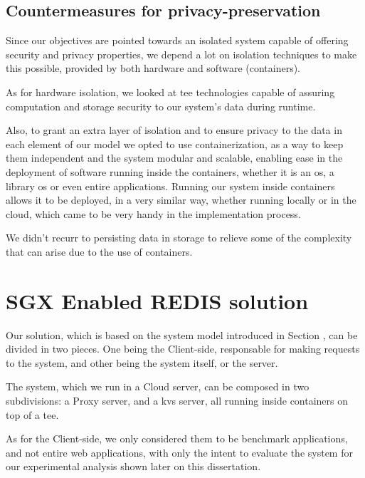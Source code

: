 \subsection{Countermeasures for privacy-preservation}

Since our objectives are pointed towards an isolated system capable of offering security
and privacy properties, we depend a lot on isolation techniques to make this possible,
provided by both hardware and software (containers).

As for hardware isolation, we looked at \gls{tee} technologies capable of assuring computation and storage security to our system's data during runtime.

Also, to grant an extra layer of isolation and to ensure privacy to the data in each element of our model we opted to use containerization, as a way to keep them independent and the system modular and scalable, enabling ease in the deployment of software running inside the containers, whether it is an \gls{os}, a library
\gls{os} or even entire applications. Running our system inside containers allows it to be deployed, in a very similar way, whether running locally or in the cloud, which came to be very handy in the implementation process. 

We didn't recurr to persisting data in storage to relieve some of the complexity that can arise due to the use of containers.





\section{SGX Enabled REDIS solution} %
\label{sec:sgx_redis_solution}

Our solution, which is based on the system model introduced in Section \cite{sec:systemModel_overview}, can be divided in two pieces. One being the Client-side, responsable for making requests to the system, and other being the system itself, or the server. 

The system, which we run in a Cloud server, can be composed in two subdivisions: a Proxy server, and a \gls{kvs} server, all running inside containers on top of a \gls{tee}. 

As for the Client-side, we only considered them to be benchmark applications, and not entire web applications, with only the intent to evaluate the system for our experimental analysis shown later on this dissertation.

